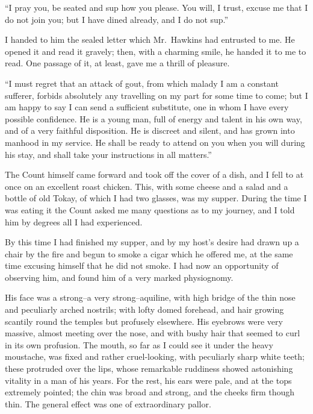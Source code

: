 \documentclass[12pt,openright]{book}
\begin{document}
“I pray you, be seated and sup how you please. You will, I trust, excuse me that I do not join you; but I have dined already, and I do not sup.”

I handed to him the sealed letter which Mr. Hawkins had entrusted to me. He opened it and read it gravely; then, with a charming smile, he handed it to me to read. One passage of it, at least, gave me a thrill of pleasure.

“I must regret that an attack of gout, from which malady I am a constant sufferer, forbids absolutely any travelling on my part for some time to come; but I am happy to say I can send a sufficient substitute, one in whom I have every possible confidence. He is a young man, full of energy and talent in his own way, and of a very faithful disposition. He is discreet and silent, and has grown into manhood in my service. He shall be ready to attend on you when you will during his stay, and shall take your instructions in all matters.”

The Count himself came forward and took off the cover of a dish, and I fell to at once on an excellent roast chicken. This, with some cheese and a salad and a bottle of old Tokay, of which I had two glasses, was my supper. During the time I was eating it the Count asked me many questions as to my journey, and I told him by degrees all I had experienced.

By this time I had finished my supper, and by my host’s desire had drawn up a chair by the fire and begun to smoke a cigar which he offered me, at the same time excusing himself that he did not smoke. I had now an opportunity of observing him, and found him of a very marked physiognomy.

His face was a strong–a very strong–aquiline, with high bridge of the thin nose and peculiarly arched nostrils; with lofty domed forehead, and hair growing scantily round the temples but profusely elsewhere. His eyebrows were very massive, almost meeting over the nose, and with bushy hair that seemed to curl in its own profusion. The mouth, so far as I could see it under the heavy moustache, was fixed and rather cruel-looking, with peculiarly sharp white teeth; these protruded over the lips, whose remarkable ruddiness showed astonishing vitality in a man of his years. For the rest, his ears were pale, and at the tops extremely pointed; the chin was broad and strong, and the cheeks firm though thin. The general effect was one of extraordinary pallor.
\end{document}
